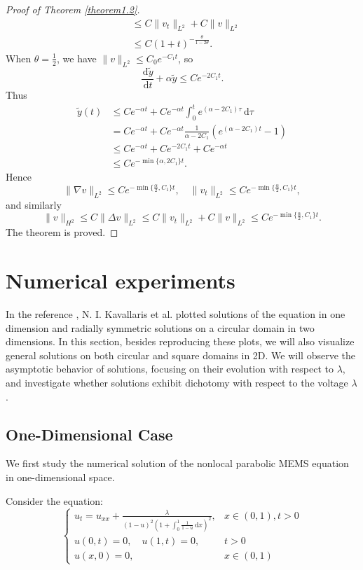 \documentclass{article}
\numberwithin{equation}{section}
\begin{document}
\begin{proof}[Proof of Theorem \ref{theorem1.2}]
\begin{align*}
    &\le C\|v_t\|_{L^2}+C\|v\|_{L^2}\\
    &\le C(1+t)^{-\frac{\theta}{1-2\theta}}.
\end{align*}
When $\theta=\frac{1}{2}$, we have $\|v\|_{L^2}\le C_0 e^{-C_1 t}$, so
$$\frac{\,\mathrm{d}\widetilde{y}}{\,\mathrm{d}t}+\alpha\widetilde{y}\le Ce^{-2C_1 t}.$$
Thus
\begin{align*}
    \widetilde{y}(t)&\le Ce^{-\alpha t}+Ce^{-\alpha t}\int_{0}^{t}e^{(\alpha-2C_1)\tau}\,\mathrm{d}\tau\\
    &= Ce^{-\alpha t}+Ce^{-\alpha t}\frac{1}{\alpha-2C_1}\left(e^{(\alpha-2C_1)t}-1\right)\\
    &\le Ce^{-\alpha t}+Ce^{-2C_1 t}+Ce^{-\alpha t}\\
    &\le Ce^{-\min\{\alpha,2C_1\}t}.
\end{align*}
Hence
$$\|\nabla v\|_{L^2}\le Ce^{-\min\{\frac{\alpha}{2},C_1\}t},\quad \|v_t\|_{L^2}\le Ce^{-\min\{\frac{\alpha}{2},C_1\}t},$$
and similarly
$$\|v\|_{H^2}\le C\|\Delta v\|_{L^2}\le C\|v_t\|_{L^2}+C\|v\|_{L^2}\le Ce^{-\min\{\frac{\alpha}{2},C_1\}t}.$$
The theorem is proved.
\end{proof}
	
\section{Numerical experiments}

\qquad In the reference \cite{ref5}, N. I. Kavallaris et al. plotted solutions of the equation in one dimension and radially symmetric solutions on a circular domain in two dimensions. In this section, besides reproducing these plots, we will also visualize general solutions on both circular and square domains in 2D. We will observe the asymptotic behavior of solutions, focusing on their evolution with respect to $\lambda$, and investigate whether solutions exhibit dichotomy with respect to the voltage $\lambda$.

\subsection{One-Dimensional Case}
\qquad We first study the numerical solution of the nonlocal parabolic MEMS equation in one-dimensional space.

Consider the equation:
\begin{equation}
    \begin{cases}
        u_{t}=u_{xx}+\frac{\lambda}{(1-u)^2(1+\int_{0}^{1}\frac{1}{1-u}\,\mathrm{d}x)^2},&x\in (0,1),t>0\\
        u(0,t)=0,\quad u(1,t)=0,&t>0\\
        u(x,0)=0,&x\in(0,1)
    \end{cases}\label{3.1}
\end{equation}
\end{document}
